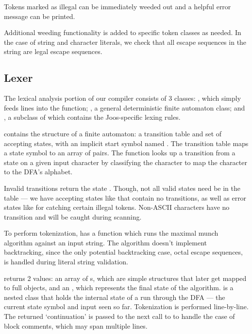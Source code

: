 \documentclass[pdftex,11pt,a4paper]{article}
\begin{document}
Tokens marked as illegal can be immediately weeded out and a helpful
error message can be printed.

Additional weeding functionality is added to specific token classes as
needed. In the case of string and character literals, we check that
all escape sequences in the string are legal escape sequences.


\subsection{Lexer}

The lexical analysis portion of our compiler consists of 3 classes:
, which simply feeds lines into the 
function; , a general deterministic finite automaton class;
and , a subclass of  which contains the
Joos-specific lexing rules.

 contains the structure of a finite automaton: a
transition table and set of accepting states, with an implicit start
symbol named . The transition table maps a state symbol to an
array of  pairs. The  function
looks up a transition from a state on a given input character by
classifying the character to map the character to the DFA's
alphabet.

Invalid transitions return the state . Though, not all
valid states need be in the table --- we have accepting states like
 that contain no transitions, as well as error
states like  for catching certain illegal
tokens. Non-ASCII characters have no transition and will be caught
during scanning.

To perform tokenization,  has a function 
which runs the maximal munch algorithm against an input string. The
algorithm doesn't implement backtracking, since the only potential
backtracking case, octal escape sequences, is handled during literal
string validation.

 returns 2 values: an array of s, which
are simple structures that later get mapped to full 
objects, and an , which represents the final state of the
algorithm.  is a nested class that holds the internal
state of a run through the DFA --- the current state symbol and input seen so
far. Tokenization is performed line-by-line. The returned
 `continuation' is passed to the next call to
 to handle the case of block comments, which may span
multiple lines.
\end{document}
